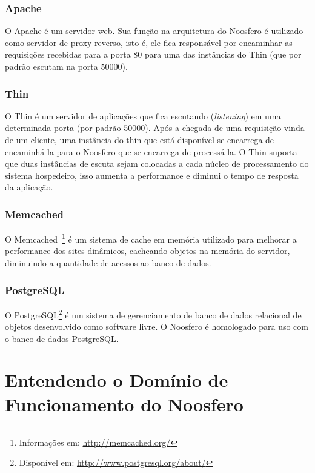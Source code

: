 \subsubsection*{Apache}

O Apache é um servidor web. Sua função na arquitetura do Noosfero é utilizado como servidor de proxy reverso, isto é, ele fica responsável por encaminhar as requisições recebidas para a porta 80 para uma das instâncias do Thin (que por padrão escutam na porta 50000).

\subsubsection*{Thin}

O Thin é um servidor de aplicações que fica escutando (\textit{listening}) em uma determinada porta (por padrão 50000). Após a chegada de uma requisição vinda de um cliente, uma instância do thin que está disponível se encarrega de encaminhá-la para o Noosfero que se encarrega de processá-la. O Thin suporta que duas instâncias de escuta sejam colocadas a cada núcleo de processamento do sistema hospedeiro, isso aumenta a performance e diminui o tempo de resposta da aplicação.

\subsubsection*{Memcached}

O Memcached~\footnote{Informações em: \url{http://memcached.org/}} é um sistema de cache em memória utilizado para melhorar a performance dos sites dinâmicos, cacheando objetos na memória do servidor, diminuindo a quantidade de acessos ao banco de dados.

\subsubsection*{PostgreSQL}

O PostgreSQL\footnote{Disponível em: \url{http://www.postgresql.org/about/}} é um sistema de gerenciamento de banco de dados relacional de objetos desenvolvido como software livre. O Noosfero é homologado para uso com o banco de dados PostgreSQL.

\section{Entendendo o Domínio de Funcionamento do Noosfero}
\label{sub:dominionoosfero}

